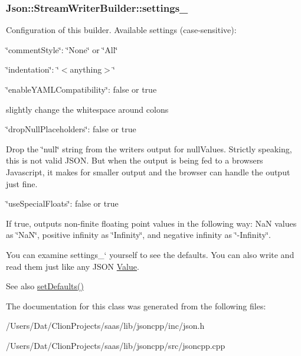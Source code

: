 \subsubsection[{\texorpdfstring{settings\+\_\+}{settings_}}]{ Json\+::\+Stream\+Writer\+Builder\+::settings\+\_\+}\hypertarget{class_json_1_1_stream_writer_builder_a79bdf2e639a52f4e758c0b95bd1d3423}{}\label{class_json_1_1_stream_writer_builder_a79bdf2e639a52f4e758c0b95bd1d3423}
Configuration of this builder. Available settings (case-\/sensitive)\+:
\begin{DoxyItemize}
\item \char`\"{}comment\+Style\char`\"{}\+: \char`\"{}\+None\char`\"{} or \char`\"{}\+All\char`\"{}
\item \char`\"{}indentation\char`\"{}\+: \char`\"{}$<$anything$>$\char`\"{}
\item \char`\"{}enable\+Y\+A\+M\+L\+Compatibility\char`\"{}\+: false or true
\begin{DoxyItemize}
\item slightly change the whitespace around colons
\end{DoxyItemize}
\item \char`\"{}drop\+Null\+Placeholders\char`\"{}\+: false or true
\begin{DoxyItemize}
\item Drop the \char`\"{}null\char`\"{} string from the writer\textquotesingle{}s output for null\+Values. Strictly speaking, this is not valid J\+S\+ON. But when the output is being fed to a browser\textquotesingle{}s Javascript, it makes for smaller output and the browser can handle the output just fine.
\end{DoxyItemize}
\item \char`\"{}use\+Special\+Floats\char`\"{}\+: false or true
\begin{DoxyItemize}
\item If true, outputs non-\/finite floating point values in the following way\+: NaN values as \char`\"{}\+Na\+N\char`\"{}, positive infinity as \char`\"{}\+Infinity\char`\"{}, and negative infinity as \char`\"{}-\/\+Infinity\char`\"{}.
\end{DoxyItemize}
\end{DoxyItemize}

You can examine \textquotesingle{}settings\+\_\+` yourself to see the defaults. You can also write and read them just like any J\+S\+ON \hyperlink{class_json_1_1_value}{Value}. \begin{DoxySeeAlso}{See also}
\hyperlink{class_json_1_1_stream_writer_builder_a53bf106b141e28637b01ad0ecd2acbf6}{set\+Defaults()} 
\end{DoxySeeAlso}


The documentation for this class was generated from the following files\+:\begin{DoxyCompactItemize}
\item 
/\+Users/\+Dat/\+Clion\+Projects/saas/lib/jsoncpp/inc/json.\+h\item 
/\+Users/\+Dat/\+Clion\+Projects/saas/lib/jsoncpp/src/jsoncpp.\+cpp\end{DoxyCompactItemize}
